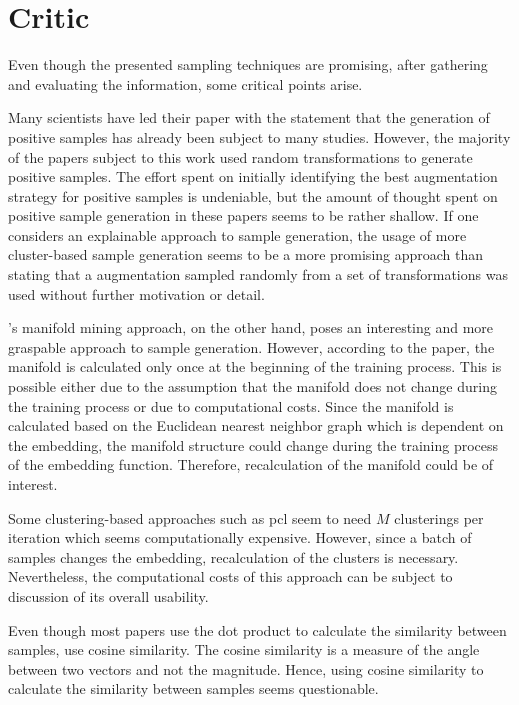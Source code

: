 \section{Critic}\label{sec:critic}

Even though the presented sampling techniques are promising, after gathering and evaluating the information, 
some critical points arise.

Many scientists have led their paper with the statement that the generation of positive samples has already been subject to many studies.
However, the majority of the papers subject to this work used random transformations to generate positive samples.
The effort spent on initially identifying the best augmentation strategy for positive samples is undeniable, 
but the amount of thought spent on positive sample generation in these papers seems to be rather shallow.
If one considers an explainable approach to sample generation, 
the usage of more cluster-based sample generation seems to be a more promising approach than stating that a augmentation sampled randomly 
from a set of transformations was used without further motivation or detail.

\citet{mining_manifolds_2018}'s manifold mining approach, on the other hand, poses an interesting and more graspable approach to sample generation. 
However, according to the paper, the manifold is calculated only once at the beginning of the training process.
This is possible either due to the assumption that the manifold does not change during the training process or 
due to computational costs.
Since the manifold is calculated based on the Euclidean nearest neighbor graph which is dependent on the embedding, 
the manifold structure could change during the training process of the embedding function.
Therefore, recalculation of the manifold could be of interest.

Some clustering-based approaches such as \ac{pcl} seem to need $M$ clusterings per iteration 
which seems computationally expensive. 
However, since a batch of samples changes the embedding, recalculation of the clusters is necessary.
Nevertheless, the computational costs of this approach can be subject to discussion of its overall usability.

Even though most papers use the dot product to calculate the similarity between samples, 
\citet{mining_potential_2024} use cosine similarity.
The cosine similarity is a measure of the angle between two vectors and not the magnitude.
Hence, using cosine similarity to calculate the similarity between samples seems questionable.

